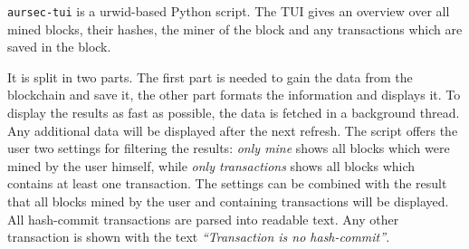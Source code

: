 \label{sec:tui}
\texttt{aursec-tui} is a urwid-based Python script. The TUI gives an overview over all mined blocks, their hashes, the miner of the block and any transactions which are saved in the block.

It is split in two parts. The first part is needed to gain the data from the blockchain and save it, the other part formats the information and displays it.
To display the results as fast as possible, the data is fetched in a background thread.
Any additional data will be displayed after the next refresh.
The script offers the user two settings for filtering the results:
\emph{only mine} shows all blocks which were mined by the user himself,
while \emph{only transactions} shows all blocks which contains at least one transaction.
The settings can be combined with the result that all blocks mined by the user and containing transactions will be displayed.
All hash-commit transactions are parsed into readable text.
Any other transaction is shown with the text \emph{``Transaction is no hash-commit''}.
